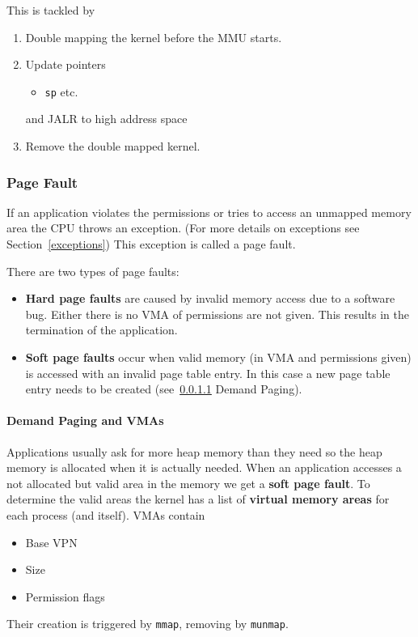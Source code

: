 This is tackled by
\begin{enumerate}
    \item Double mapping the kernel before the MMU starts.
    \item Update pointers
    \begin{itemize}
        \item \texttt{sp} etc. %
    \end{itemize}
    and JALR to high address space
    \item Remove the double mapped kernel.
\end{enumerate}

\subsubsection{Page Fault}
If an application violates the permissions or tries to access an unmapped memory area the CPU throws an exception. (For more details on exceptions see Section~\ref{exceptions}) This exception is called a page fault.

There are two types of page faults:
\begin{itemize}
    \item \textbf{Hard page faults} are caused by invalid memory access due to a software bug. Either there is no VMA of permissions are not given. This results in the termination of the application.
    \item \textbf{Soft page faults} occur when valid memory (in VMA and permissions given) is accessed with an invalid page table entry. In this case a new page table entry needs to be created (see~\ref{page demanding} Demand Paging).
\end{itemize}

\paragraph{Demand Paging and VMAs}\label{page demanding}
Applications usually ask for more heap memory than they need so the heap memory is allocated when it is actually needed.
When an application accesses a not allocated but valid area in the memory we get a \textbf{soft page fault}. To determine the valid areas the kernel has a list of \textbf{virtual memory areas} for each process (and itself). VMAs contain
\begin{itemize}
    \item Base VPN
    \item Size
    \item Permission flags
\end{itemize}
Their creation is triggered by \texttt{mmap}, removing by \texttt{munmap}.

